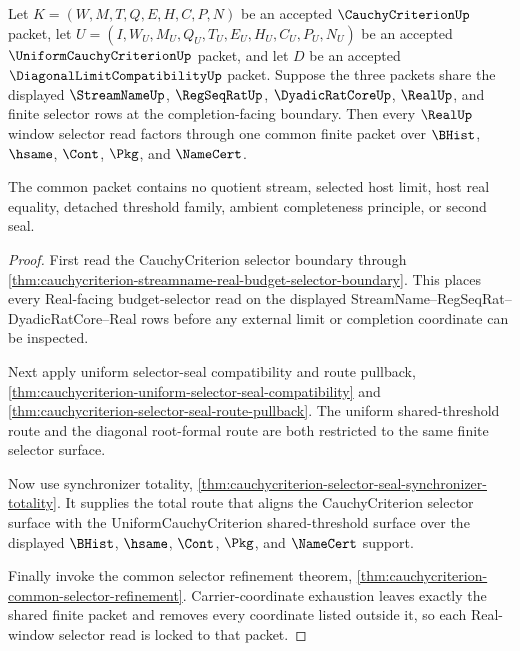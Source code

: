 \begin{theorem}
\label{thm:cauchycriterion-real-window-diagonal-selector-lock}
Let $K=(W,M,T,Q,E,H,C,P,N)$ be an accepted $\CauchyCriterionUp$ packet, let $U=(I,W_U,M_U,Q_U,T_U,E_U,H_U,C_U,P_U,N_U)$ be an accepted $\UniformCauchyCriterionUp$ packet, and let $D$ be an accepted $\DiagonalLimitCompatibilityUp$ packet. Suppose the three packets share the displayed $\StreamNameUp$, $\RegSeqRatUp$, $\DyadicRatCoreUp$, $\RealUp$, and finite selector rows at the completion-facing boundary. Then every $\RealUp$ window selector read factors through one common finite packet over $\BHist$, $\hsame$, $\Cont$, $\Pkg$, and $\NameCert$.

The common packet contains no quotient stream, selected host limit, host real equality, detached threshold family, ambient completeness principle, or second seal.
\end{theorem}
\begin{proof}
First read the CauchyCriterion selector boundary through \autoref{thm:cauchycriterion-streamname-real-budget-selector-boundary}. This places every Real-facing budget-selector read on the displayed StreamName--RegSeqRat--DyadicRatCore--Real rows before any external limit or completion coordinate can be inspected.

Next apply uniform selector-seal compatibility and route pullback, \autoref{thm:cauchycriterion-uniform-selector-seal-compatibility} and \autoref{thm:cauchycriterion-selector-seal-route-pullback}. The uniform shared-threshold route and the diagonal root-formal route are both restricted to the same finite selector surface.

Now use synchronizer totality, \autoref{thm:cauchycriterion-selector-seal-synchronizer-totality}. It supplies the total route that aligns the CauchyCriterion selector surface with the UniformCauchyCriterion shared-threshold surface over the displayed $\BHist$, $\hsame$, $\Cont$, $\Pkg$, and $\NameCert$ support.

Finally invoke the common selector refinement theorem, \autoref{thm:cauchycriterion-common-selector-refinement}. Carrier-coordinate exhaustion leaves exactly the shared finite packet and removes every coordinate listed outside it, so each Real-window selector read is locked to that packet.
\end{proof}

